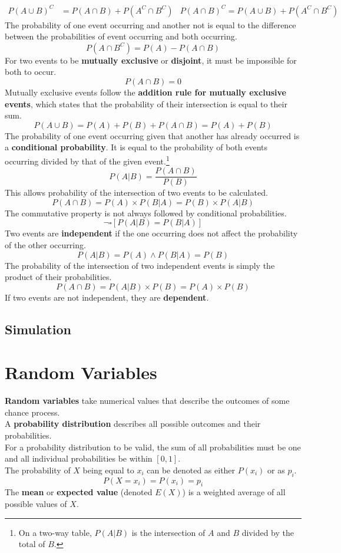 \documentclass[../AP_Statistics.tex]{subfiles}
\begin{document}
		\begin{align*}
			P(A\cup B)^C &= P(A\cap B) + P\left(A^C\cap B^C\right)	& P(A\cap B)^C = P(A\cup B) + P\left(A^C \cap B^C\right)
			\end{align*}
		The probability of one event occurring and another not is equal to the difference between the probabilities of event occurring and both occurring.
		$$P\left(A\cap B^C\right) = P(A) - P(A\cap B)$$
		For two events to be \textbf{mutually exclusive} or \textbf{disjoint}, it must be impossible for both to occur.
		$$P(A\cap B) = 0$$
		Mutually exclusive events follow the \textbf{addition rule for mutually exclusive events}, which states that the probability of their intersection is equal to their sum.
		$$P(A\cup B) = P(A) + P(B) + P(A\cap B) = P(A) + P(B)$$
		The probability of one event occurring given that another has already occurred is a \textbf{conditional probability}. It is equal to the probability of both events occurring divided by that of the given event.\footnote{On a two-way table, $P(A|B)$ is the intersection of $A$ and $B$ divided by the total of $B$.}
		$$P(A|B) = \frac{P(A\cap B)}{P(B)}$$
		This allows probability of the intersection of two events to be calculated.
		$$P(A\cap B) = P(A) \times P(B|A) = P(B) \times P(A|B)$$
		The commutative property is not always followed by conditional probabilities.
		$$\lnot\square[P(A|B) = P(B|A)]$$
		Two events are \textbf{independent} if the one occurring does not affect the probability of the other occurring.
		$$P(A|B) = P(A) \land P(B|A) = P(B)$$
		The probability of the intersection of two independent events is simply the product of their probabilities.
		$$P(A\cap B) = P(A|B) \times P(B) = P(A) \times P(B)$$
		If two events are not independent, they are \textbf{dependent}.
		\section*{Simulation}
	\chapter{Random Variables}
		\textbf{Random variables} take numerical values that describe the outcomes of some chance process. \\
		A \textbf{probability distribution} describes all possible outcomes and their probabilities. \\
		For a probability distribution to be valid, the sum of all probabilities must be one and all individual probabilities be within $[0,1]$. \\
		The probability of $X$ being equal to $x_i$ can be denoted as either $P(x_i)$ or as $p_i$.
		$$P(X = x_i) = P(x_i) = p_i$$
		The \textbf{mean} or \textbf{expected value} (denoted $E(X)$) is a weighted average of all possible values of $X$.
\end{document}

